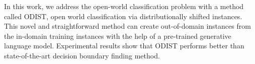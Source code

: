 In this work, we address the open-world classification problem with a method called ODIST, open world classification via distributionally shifted instances. This novel and straightforward method can create out-of-domain instances from the in-domain training instances with the help of a pre-trained generative language model. Experimental results show that ODIST performs better than state-of-the-art decision boundary finding method.
